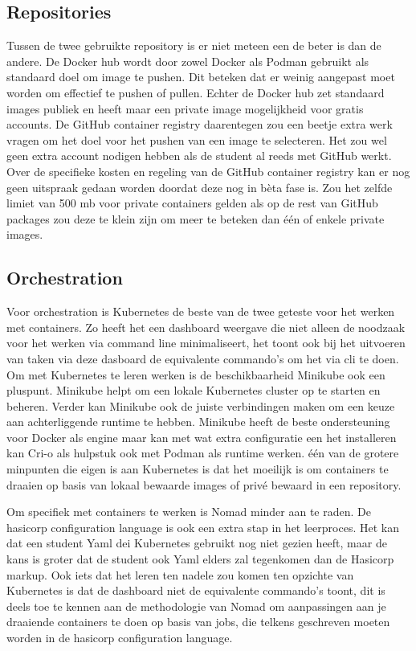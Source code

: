 \subsection{Repositories}

Tussen de twee gebruikte repository is er niet meteen een de beter is dan de andere. De Docker hub wordt door zowel Docker als Podman gebruikt als standaard doel om image te pushen. Dit beteken dat er weinig aangepast moet worden om effectief te pushen of pullen. Echter de Docker hub zet standaard images publiek en heeft maar een private image mogelijkheid voor gratis accounts. De GitHub container registry daarentegen zou een beetje extra werk vragen om het doel voor het pushen van een image te selecteren. Het zou wel geen extra account nodigen hebben als de student al reeds met GitHub werkt. Over de specifieke kosten en regeling van de GitHub container registry kan er nog geen uitspraak gedaan worden doordat deze nog in bèta fase is. Zou het zelfde limiet  van 500 mb voor private containers gelden als op de rest van GitHub packages zou deze te klein zijn om meer te beteken dan één of enkele private images.

\subsection{Orchestration}

Voor orchestration is Kubernetes de beste van de twee geteste voor het werken met containers. Zo heeft het een dashboard weergave die niet alleen de noodzaak voor het werken via command line minimaliseert, het toont ook bij het uitvoeren van taken via deze dasboard de equivalente commando’s om het via cli te doen. Om met Kubernetes te leren werken is de beschikbaarheid Minikube ook een pluspunt. Minikube helpt om een lokale Kubernetes cluster op te starten en beheren. Verder kan Minikube ook de juiste verbindingen maken om een keuze aan achterliggende runtime te hebben.  Minikube heeft de beste ondersteuning voor Docker als engine maar kan met wat extra configuratie een het installeren kan Cri-o als hulpstuk ook met Podman als runtime werken. één van de grotere minpunten die eigen is aan Kubernetes is dat het moeilijk is om containers te draaien op basis van lokaal bewaarde images of privé bewaard in een repository.

Om specifiek met containers te werken is Nomad minder aan te raden. De hasicorp configuration language is ook een extra stap in het leerproces. Het kan dat een student Yaml dei Kubernetes gebruikt nog niet gezien heeft, maar de kans is groter dat de student ook Yaml elders zal tegenkomen dan de Hasicorp markup. Ook iets dat het leren ten nadele zou komen ten opzichte van Kubernetes is dat de dashboard niet de equivalente commando’s toont, dit is deels toe te kennen aan de methodologie van Nomad om aanpassingen aan je draaiende containers te doen op basis van jobs, die telkens geschreven moeten worden in de hasicorp configuration language.
